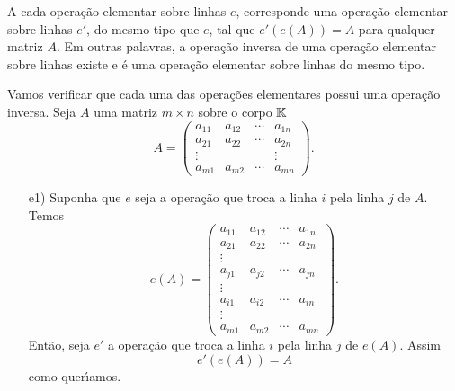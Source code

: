 \begin{teorema}
	A cada opera\c{c}\~ao elementar sobre linhas $e$, corresponde uma opera\c{c}\~ao elementar sobre linhas $e'$, do mesmo tipo que $e$, tal que $e'(e(A)) = A$ para qualquer matriz $A$. Em outras palavras, a opera\c{c}\~ao inversa de uma opera\c{c}\~ao elementar sobre linhas existe e \'e uma opera\c{c}\~ao elementar sobre linhas do mesmo tipo.
\end{teorema}
\begin{prova}
	Vamos verificar que cada uma das opera\c{c}\~oes elementares possui uma opera\c{c}\~ao inversa. Seja $A$ uma matriz $m \times n$ sobre o corpo $\mathbb{K}$
	\[
		A = \begin{pmatrix}
			a_{11} & a_{12} & \cdots & a_{1n}\\
			a_{21} & a_{22} & \cdots & a_{2n}\\
			\vdots & & & \vdots\\
			a_{m1} & a_{m2} & \cdots & a_{mn}
		\end{pmatrix}.
	\]
	\begin{enumerate}
		\item [e1)] Suponha que $e$ seja a opera\c{c}\~ao que troca a linha $i$ pela linha $j$ de $A$. Temos
		\[
		   e(A) = 
		   			\begin{pmatrix}
						a_{11} & a_{12} & \cdots & a_{1n}\\
						a_{21} & a_{22} & \cdots & a_{2n}\\
						\vdots\\
						a_{j1} & a_{j2} & \cdots & a_{jn}\\
						\vdots\\
						a_{i1} & a_{i2} & \cdots & a_{in}\\
						\vdots\\
						a_{m1} & a_{m2} & \cdots & a_{mn}
				    \end{pmatrix}.
		\]
		Ent\~ao, seja $e'$ a opera\c{c}\~ao que troca a linha $i$ pela linha $j$ de $e(A)$. Assim
		\[
			e'(e(A)) = A
		\]
		como quer{\'\i}amos.


\end{enumerate}
\end{prova}
